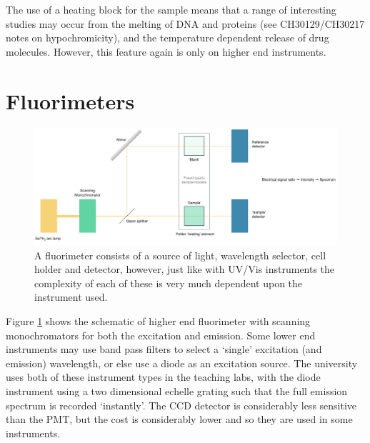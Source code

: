 \documentclass[
]{book}
\begin{document}
The use of a heating block for the sample means that a range of interesting studies may occur from the melting of DNA and proteins (see CH30129/CH30217 notes on hypochromicity), and the temperature dependent release of drug molecules. However, this feature again is only on higher end instruments.

\hypertarget{sec:fluorimeter}{%
\section{Fluorimeters}\label{sec:fluorimeter}}

\begin{figure}

{\centering \includegraphics[width=1\linewidth]{images/UVvis} 

}

\caption{A fluorimeter consists of a source of light, wavelength selector, cell holder and detector, however, just like with UV/Vis instruments the complexity of each of these is very much dependent upon the instrument used.}\label{fig:fluorimeter}
\end{figure}

Figure \ref{fig:fluorimeter} shows the schematic of higher end fluorimeter with scanning monochromators for both the excitation and emission. Some lower end instruments may use band pass filters to select a `single' excitation (and emission) wavelength, or else use a diode as an excitation source. The university uses both of these instrument types in the teaching labs, with the diode instrument using a two dimensional echelle grating such that the full emission spectrum is recorded `instantly'. The CCD detector is considerably less sensitive than the PMT, but the cost is considerably lower and so they are used in some instruments.
\end{document}
